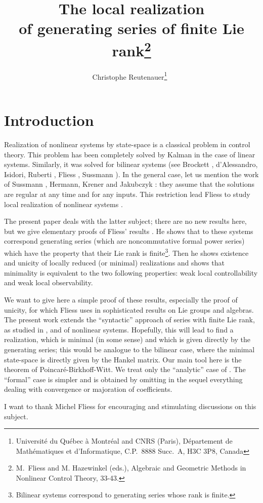 \documentclass[a4paper,12pt]{article}
\title{The local realization\\of generating series of finite Lie rank\footnote{M.\ Fliess and M. Hazewinkel (eds.), Algebraic and Geometric Methods in Nonlinear Control Theory, 33-43.}}
\author{Christophe Reutenauer\texorpdfstring{\thanks{Université du Québec à Montréal and CNRS (Paris), Département de Mathématiques et d'Informatique, C.P.\ 8888 Succ.\ A, H3C 3P8, Canada}~}{}}
\date{}
\begin{document}
\maketitle

\section{Introduction}

Realization of nonlinear systems by state-space is a classical problem in control theory. This problem has been completely solved by Kalman \cite{10} in the case of linear systems. Similarly, it was solved for bilinear systems (see Brockett \cite{2}, d'Alessandro, Isidori, Ruberti \cite{1}, Fliess \cite{3}, Sussmann \cite{12}). In the general case, let us mention the work of Sussmann \cite{13}, Hermann, Krener \cite{7} and Jakubczyk \cite{9}: they assume that the solutions are regular at any time and for any inputs. This restriction lead Fliess to study local realization of nonlinear systems \cite{5}.

The present paper deals with the latter subject; there are no new results here, but we give elementary proofs of Fliess' results \cite{5}. He shows that to these systems correspond generating series (which are noncommutative formal power series) which have the property that their Lie rank is finite\footnote{Bilinear systems correspond to generating series whose rank is finite.}. Then he shows existence and unicity of locally reduced (or minimal) realizations and shows that minimality is equivalent to the two following properties: weak local controllability and weak local observability.

We want to give here a simple proof of these results, especially the proof of unicity, for which Fliess uses in \cite{5} sophisticated results on Lie groups and algebras. The present work extends the ``syntactic'' approach of series with finite Lie rank, as studied in \cite{5}, and of nonlinear systems. Hopefully, this will lead to find a realization, which is minimal (in some sense) and which is given directly by the generating series; this would be analogue to the bilinear case, where the minimal state-space is directly given by the Hankel matrix.
Our main tool here is the theorem of Poincaré-Birkhoff-Witt. We treat only the ``analytic'' case of \cite{5}. The ``formal'' case is simpler and is obtained by omitting in the sequel everything dealing with convergence or majoration of coefficients.

I want to thank Michel Fliess for encouraging and stimulating discussions on this subject.
\end{document}
